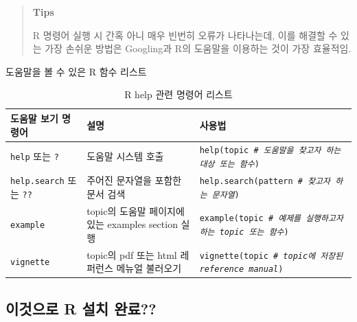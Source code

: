 \documentclass[12pt,a4paper]{book}
\theoremstyle{definition}
\theoremstyle{definition}
\theoremstyle{definition}
\theoremstyle{remark}
\begin{document}
\begin{quote}
\colorbox{gray!10}{\begin{minipage}{15cm}
\textbf{Tips}

R 명령어 실행 시 간혹 아니 매우 빈번히 오류가 나타나는데, 이를 해결할 수 있는 가장 손쉬운 방법은 Googling과 R의 도움말을 이용하는 것이 가장 효율적임. 
\end{minipage}}
\end{quote}

도움말을 볼 수 있은 R 함수 리스트

\begin{table}[H]
  \centering
  \begingroup\footnotesize
  \caption{R help 관련 명령어 리스트}
  \begin{tabular}{p{3cm}p{5cm}p{7cm}}
  \toprule
  \textbf{도움말 보기 명령어} & \textbf{설명} & \textbf{사용법} \\
  \midrule
  \texttt{help} 또는 \texttt{?}          & 도움말 시스템 호출               & \texttt{help(topic \textit{\# 도움말을 찾고자 하는 대상 또는 함수}) }\\
  \texttt{help.search} 또는 \texttt{??}  & 주어진 문자열을 포함한 문서 검색 & \texttt{help.search(pattern \textit{\# 찾고자 하는 문자열})} \\ 
  \texttt{example}                       & topic의 도움말 페이지에 있는 examples section 실행 & \texttt{example(topic \textit{\# 예제를 실행하고자 하는 topic 또는 함수})} \\
  \texttt{vignette}                      & topic의 pdf 또는 html 레퍼런스 메뉴얼 불러오기 & \texttt{vignette(topic \textit{\# topic에 저장된 reference manual})} \\
  \bottomrule
  \end{tabular}
  \endgroup
\end{table}

\subsection{이것으로 R 설치 완료??}\label{-r--}
\end{document}
